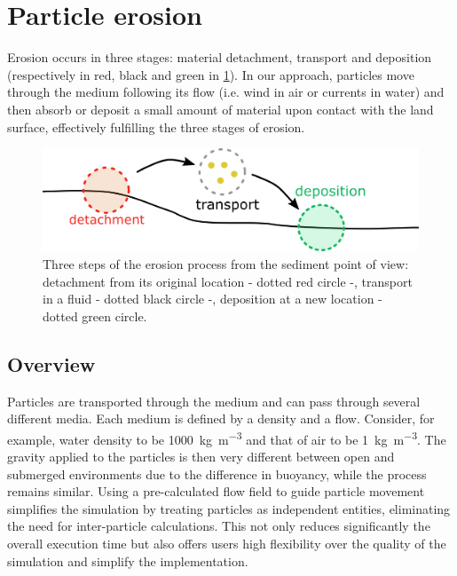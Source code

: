 \section{Particle erosion}%
\label{sec:erosion_method}
Erosion occurs in three stages: material detachment, transport and deposition (respectively in red, black and green in \cref{fig:erosion_ablation_erosion}). In our approach, particles move through the medium following its flow (i.e. wind in air or currents in water) and then absorb or deposit a small amount of material upon contact with the land surface, effectively fulfilling the three stages of erosion.
\begin{figure}[ht]
\centering
\includegraphics[width=0.95\linewidth]{ablation_erosion.pdf}
\caption{Three steps of the erosion process from the sediment point of view: detachment from its original location - dotted red circle -, transport in a fluid - dotted black circle -, deposition at a new location - dotted green circle.}
\label{fig:erosion_ablation_erosion}

\end{figure}
\subsection{Overview}
Particles are transported through the medium and can pass through several different media. Each medium is defined by a density and a flow. Consider, for example, water density to be \SI{1000}{\kilogram \per \cubic \meter} and that of air to be \SI{1}{\kilogram \per \cubic \meter}. The gravity applied to the particles is then very different between open and submerged environments due to the difference in buoyancy, while the process remains similar.
Using a pre-calculated flow field to guide particle movement simplifies the simulation by treating particles as independent entities, eliminating the need for inter-particle calculations. This not only reduces significantly the overall execution time but also offers users high flexibility over the quality of the simulation and simplify the implementation. 
